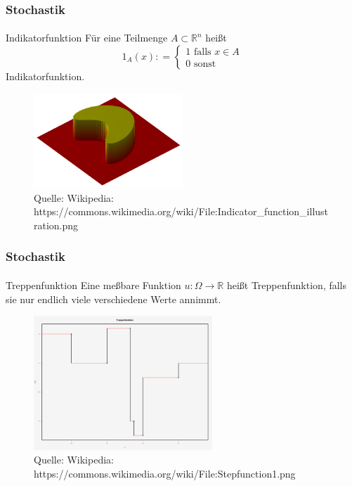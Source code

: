 \documentclass{beamer}
\begin{document}
\begin{frame}
    \frametitle{Stochastik}
\framesubtitle{}
\begin{block}{Indikatorfunktion}
    Für eine Teilmenge $A \subset \mathbb{R}^n$ heißt
    $$ 1_A (x): = \begin{cases} 1 \text{  falls }   x \in A  \\  0  \text{  sonst}  \end{cases}$$
    Indikatorfunktion.
    \end{block}
    
    \begin{figure}[H]
          \centering
        \includegraphics[width=0.5\textwidth]{img/640px-Indicator_function_illustration}
          \caption{Quelle: Wikipedia: https://commons.wikimedia.org/wiki/File:Indicator\_function\_illustration.png}
    
    \end{figure}
\end{frame}



\begin{frame}
    \frametitle{Stochastik}
\framesubtitle{}
    \begin{block}{Treppenfunktion}
        Eine meßbare Funktion $u: \Omega \to \mathbb{R}$ 
        heißt Treppenfunktion, 
        falls sie nur endlich viele verschiedene Werte annimmt.
    \end{block}


\begin{figure}[H]
    \centering
  \includegraphics[width=0.6\textwidth]{img/640px-Stepfunction1}
    \caption{Quelle: Wikipedia: https://commons.wikimedia.org/wiki/File:Stepfunction1.png}

\end{figure}
\end{frame}
\end{document}
